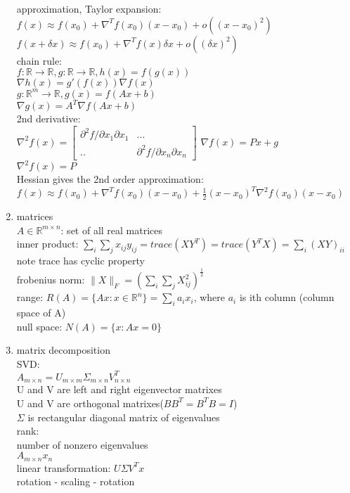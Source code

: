 \documentclass[12pt,letter]{article}
\newcommand{\R}{\mathbb{R}}
\begin{document}
\begin{enumerate}
  approximation, Taylor expansion:\\
  $f(x) \approx f(x_0) + \nabla^T f(x_0)(x-x_0) + o((x-x_0)^2)$\\
  $f(x+\delta x) \approx f(x_0) + \nabla^T f(x)\delta x + o((\delta x)^2)$\\
  
  chain rule:\\
  $f: \R \to \R, g: \R \to \R, h(x) = f(g(x))$\\
  $\nabla h(x) = g'(f(x))  \nabla f(x)$\\

  $g:\R^m \to \R, g(x) = f(Ax+b)$\\
  $\nabla g(x) = A^T \nabla f(Ax+b)$\\

  2nd derivative:\\
  $\nabla^2 f(x)=\begin{bmatrix}
    \partial^2 f / \partial x_1 \partial x_1 & ...\\
    .. & \partial^2 f / \partial x_n \partial x_n
  \end{bmatrix}$
  $\nabla f(x)=Px+g$\\
  $\nabla^2 f(x)=P$\\
  Hessian gives the 2nd order approximation:\\
  $f(x) \approx f(x_0) + \nabla^T f(x_0)(x-x_0) + \frac{1}{2}(x-x_0)^T \nabla^2 f(x_0) (x-x_0)$\\

\item matrices\\
  $A \in \R^{m \times n}$: set of all real matrices\\
  inner product: $\sum_i \sum_j x_{ij} y_{ij} = trace(XY^T)=trace(Y^TX)=\sum_{i}(XY)_{ii}$\\
  note trace has cyclic property\\
  frobenius norm: $\|X\|_F  = (\sum_i \sum_j X_{ij}^2)^{\frac{1}{2}}$\\
  range: $R(A) = \{Ax: x \in \R^n\}=\sum_i a_i x_i$, where $a_i$ is ith column (column space of A)\\
  null space: $N(A) = \{ x : Ax = 0\}$\\
  
\item matrix decomposition\\
  SVD:\\
  $A_{m \times n} = U_{m \times m} \Sigma_{m \times n} V_{n \times n}^T$\\
  U and V are left and right eigenvector matrixes\\
  U and V are orthogonal matrixes($BB^T=B^TB=I$)\\
  $\Sigma$ is rectangular diagonal matrix of eigenvalues\\

  rank:\\
  number of nonzero eigenvalues\\

  $A_{m \times n}x_{n}$\\
  linear transformation: $U \Sigma V^T x$\\
  rotation - scaling - rotation\\



\end{enumerate}
\end{document}
